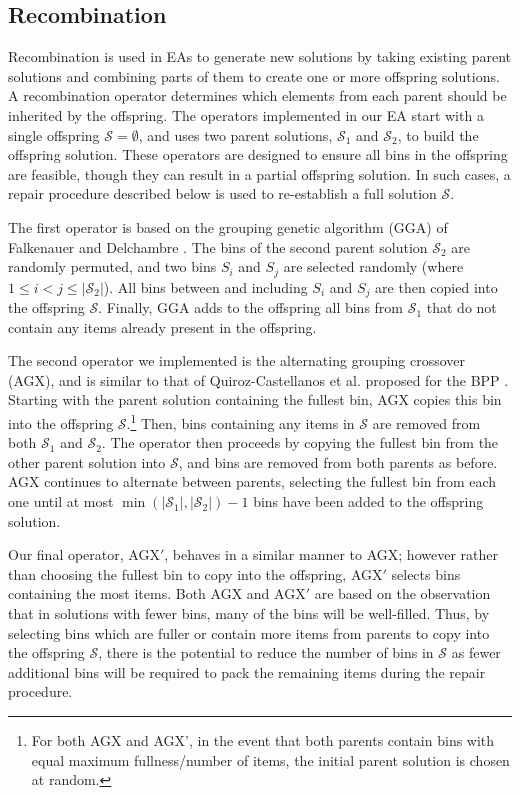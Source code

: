 \documentclass{IEEEtran}
\begin{document}
\subsection{Recombination}
\label{sub:recomb}
Recombination is used in EAs to generate new solutions by taking existing parent solutions and combining parts of them to create one or more offspring solutions. A recombination operator determines which elements from each parent should be inherited by the offspring. The operators implemented in our EA start with a single offspring $\mathcal{S} = \emptyset$, and uses two parent solutions, $\mathcal{S}_1$ and $\mathcal{S}_2$, to build the offspring solution. These operators are designed to ensure all bins in the offspring are feasible, though they can result in a partial offspring solution. In such cases, a repair procedure described below is used to re-establish a full solution $\mathcal{S}$.

The first operator is based on the grouping genetic algorithm (GGA) of Falkenauer and Delchambre \cite{falkenauer1992}. The bins of the second parent solution $\mathcal{S}_2$ are randomly permuted, and two bins $S_i$ and $S_j$ are selected randomly (where $1 \leq i < j \leq |\mathcal{S}_2|$). All bins between and including $S_i$ and $S_j$ are then copied into the offspring $\mathcal{S}$. Finally, GGA adds to the offspring all bins from $\mathcal{S}_1$ that do not contain any items already present in the offspring.

The second operator we implemented is the alternating grouping crossover (AGX), and is similar to that of Quiroz-Castellanos et al. proposed for the BPP \cite{quiroz2015}. Starting with the parent solution containing the fullest bin, AGX copies this bin into the offspring $\mathcal{S}$.\footnote{For both AGX and AGX', in the event that both parents contain bins with equal maximum fullness/number of items, the initial parent solution is chosen at random.} Then, bins containing any items in $\mathcal{S}$ are removed from both $\mathcal{S}_1$ and $\mathcal{S}_2$. The operator then proceeds by copying the fullest bin from the other parent solution into $\mathcal{S}$, and bins are removed from both parents as before. AGX continues to alternate between parents, selecting the fullest bin from each one until at most $\min (|\mathcal{S}_1|,|\mathcal{S}_2|) - 1$ bins have been added to the offspring solution.

Our final operator, AGX$'$, behaves in a similar manner to AGX; however rather than choosing the fullest bin to copy into the offspring, AGX$'$ selects bins containing the most items. Both AGX and AGX$'$ are based on the observation that in solutions with fewer bins, many of the bins will be well-filled. Thus, by selecting bins which are fuller or contain more items from parents to copy into the offspring $\mathcal{S}$, there is the potential to reduce the number of bins in $\mathcal{S}$ as fewer additional bins will be required to pack the remaining items during the repair procedure.
\end{document}

